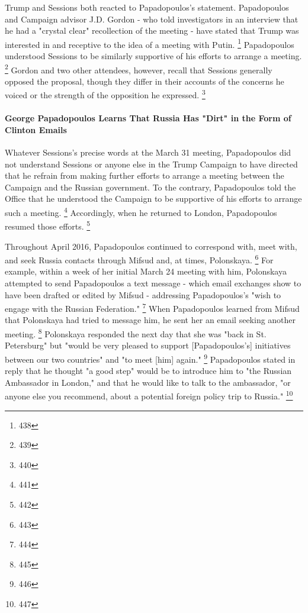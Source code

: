 Trump and Sessions both reacted to Papadopoulos's statement. Papadopoulos and Campaign advisor J.D. Gordon - who told investigators in an interview that he had a "crystal clear" recollection of the meeting - have stated that Trump was interested in and receptive to the idea of a meeting with Putin.%
\footnote{438}
Papadopoulos understood Sessions to be similarly supportive of his efforts to arrange a meeting.%
\footnote{439}
Gordon and two other attendees, however, recall that Sessions generally opposed the proposal, though they differ in their accounts of the concerns he voiced or the strength of the opposition he expressed.%
\footnote{440}

\paragraph{George Papadopoulos Learns That Russia Has "Dirt" in the Form of Clinton Emails}

Whatever Sessions's precise words at the March 31 meeting, Papadopoulos did not understand Sessions or anyone else in the Trump Campaign to have directed that he refrain from making further efforts to arrange a meeting between the Campaign and the Russian government.
To the contrary, Papadopoulos told the Office that he understood the Campaign to be supportive of his efforts to arrange such a meeting.%
\footnote{441}
Accordingly, when he returned to London, Papadopoulos resumed those efforts.%
\footnote{442}

Throughout April 2016, Papadopoulos continued to correspond with, meet with, and seek Russia contacts through Mifsud and, at times, Polonskaya.%
\footnote{443}
For example, within a week of her initial March 24 meeting with him, Polonskaya attempted to send Papadopoulos a text message - which email exchanges show to have been drafted or edited by Mifsud - addressing Papadopoulos's "wish to engage with the Russian Federation."%
\footnote{444}
When Papadopoulos learned from Mifsud that Polonskaya had tried to message him, he sent her an email seeking another meeting.%
\footnote{445}
Polonskaya responded the next day that she was "back in St. Petersburg" but "would be very pleased to support [Papadopoulos's] initiatives between our two countries" and "to meet [him] again."%
\footnote{446}
Papadopoulos stated in reply that he thought "a good step" would be to introduce him to "the Russian Ambassador in London," and that he would like to talk to the ambassador, "or anyone else you recommend, about a potential foreign policy trip to Russia."%
\footnote{447}

